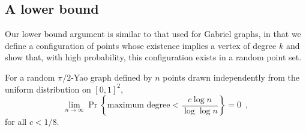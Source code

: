 \documentclass[10pt]{llncs}
\begin{document}
\subsection{A lower bound}

Our lower bound argument is similar to that used for Gabriel graphs, in
that we define a configuration of points whose existence implies a vertex
of degree $k$ and show that, with high probability, this configuration
exists in a random point set.  

\begin{thm}
For a random $\pi/2$-Yao graph defined by $n$ points drawn independently
from the uniform distribution on $[0,1]^2$,
\[
   \lim_{n\rightarrow\infty}
     \Pr\left\{\mbox{maximum degree} < \frac{c\log n}{\log\log n} \right\} 
       = 0 \enspace ,
\]
for all $c < 1/8$.
\end{thm}
\end{document}
